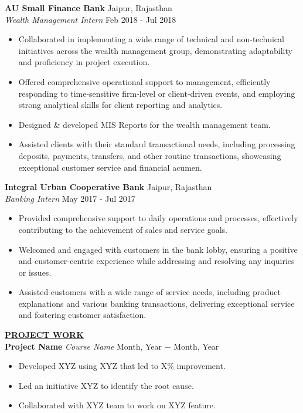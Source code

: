 \documentclass{article}
\begin{document}
\noindent \textbf{AU Small Finance Bank} \hfill Jaipur, Rajasthan \\
\textit{Wealth Management Intern} \hfill Feb 2018 - Jul 2018
\begin{itemize}[noitemsep,nolistsep,leftmargin=*]
\item Collaborated in implementing a wide range of technical and non-technical initiatives across the wealth management group, demonstrating adaptability and proficiency in project execution.
\item Offered comprehensive operational support to management, efficiently responding to time-sensitive firm-level or client-driven events, and employing strong analytical skills for client reporting and analytics.
\item Designed & developed MIS Reports for the wealth management team.
\item Assisted clients with their standard transactional needs, including processing deposits, payments, transfers, and other routine transactions, showcasing exceptional customer service and financial acumen. \\
\end{itemize}

\noindent \textbf{Integral Urban Cooperative Bank} \hfill Jaipur, Rajasthan \\
\textit{Banking Intern} \hfill May 2017 - Jul 2017
\begin{itemize}[noitemsep,nolistsep,leftmargin=*]
\item Provided comprehensive support to daily operations and processes, effectively contributing to the achievement of sales and service goals.
\item Welcomed and engaged with customers in the bank lobby, ensuring a positive and customer-centric experience while addressing and resolving any inquiries or issues.
\item Assisted customers with a wide range of service needs, including product explanations and various banking transactions, delivering exceptional service and fostering customer satisfaction. \\
\end{itemize}

%
%
\noindent \textbf{\underline{PROJECT WORK}} \\
\noindent \textbf{Project Name} \textit{Course Name} \hfill  Month, Year $-$ Month, Year
\begin{itemize}[noitemsep,nolistsep,leftmargin=*]
\item Developed XYZ using XYZ that led to X\% improvement.
\item Led an initiative XYZ to identify the root cause.
\item Collaborated with XYZ team to work on XYZ feature. \\
\end{itemize}
\end{document}
